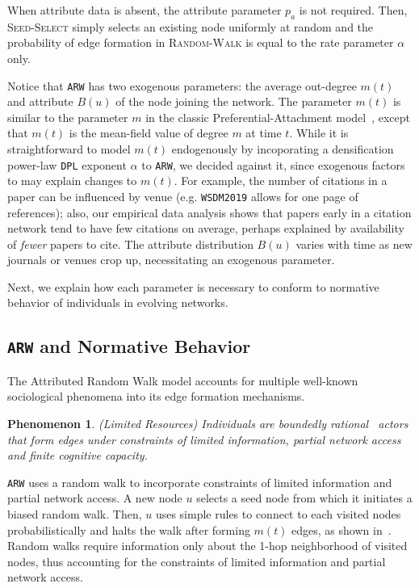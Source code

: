 When attribute data is absent, the attribute parameter $p_a$ is not required.
Then, \textsc{Seed-Select} simply selects an existing node uniformly at random
and the probability of edge formation in \textsc{Random-Walk} is equal to
the rate parameter $\alpha$ only.

Notice that \texttt{ARW} has two exogenous parameters:  the average out-degree $m(t)$ and attribute $B(u)$ of the node joining the network. The parameter $m(t)$ is similar to the parameter $m$ in the classic Preferential-Attachment model~\cite{barabasi1999emergence}, except that $m(t)$ is the mean-field value of degree $m$ at time $t$. While it is straightforward to model $m(t)$ endogenously by incoporating a densification power-law \texttt{DPL} exponent $\alpha$ to \texttt{ARW}, we decided against it, since exogenous factors to may explain changes to $m(t)$. For example, the number of citations in a paper can be influenced by venue (e.g. \texttt{WSDM2019} allows for one page of references); also, our empirical data analysis shows that papers early in a citation network tend to have few citations on average, perhaps explained by availability of \textit{fewer} papers to cite. The attribute distribution $B(u)$ varies with time as new journals or venues crop up, necessitating an exogenous parameter.



Next, we explain how each parameter is necessary to conform to normative
behavior of individuals in evolving networks.

\subsection{\texttt{ARW} and Normative Behavior}
\label{sub:Model Interpretation}

The Attributed Random Walk model accounts for multiple well-known sociological phenomena
into its edge formation mechanisms.

\newtheorem{ph}{Phenomenon}

\begin{ph}
	(Limited Resources) Individuals are boundedly rational~\cite{simon1972theories,gigerenzer1996reasoning,lipman1995information}
	actors that form edges under constraints of limited information, partial network access and finite cognitive capacity.
\end{ph}
\texttt{ARW} uses a random walk to incorporate constraints of limited information
and partial network access. A new node $u$ selects a seed node from which it
initiates a biased random walk. Then, $u$ uses simple rules to connect to each visited
nodes probabilistically and halts the walk after forming $m(t)$ edges, as shown in~. Random walks require information only about the
1-hop neighborhood of visited nodes, thus accounting for  the constraints of limited information and partial network access.

